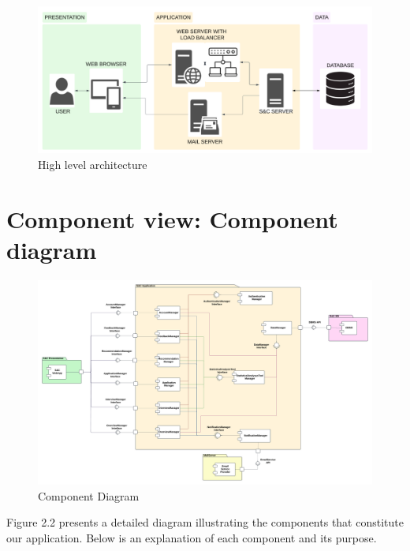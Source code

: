 \begin{figure}[H]
    \centering
    \includegraphics[width=0.8\linewidth]{DD//Images/3tier.png}
    \caption{High level architecture }
\end{figure}

\section{Component view: Component diagram}

\begin{figure}[H]
    \centering
    \includegraphics[width=1\linewidth]{DD//Images/ComponentDiagram.png}
    \caption{Component Diagram }
\end{figure}

Figure 2.2 presents a detailed diagram illustrating the components that constitute our application. Below is an explanation of each component and its purpose.

